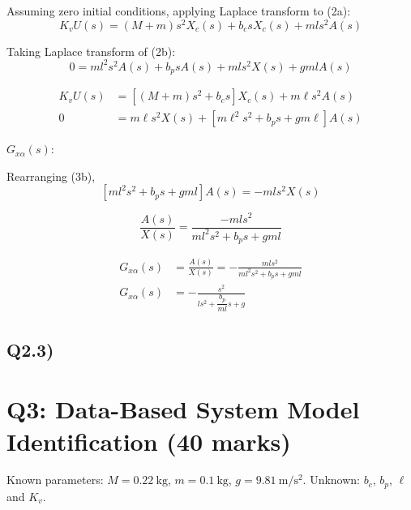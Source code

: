 \documentclass[11pt,a4paper]{article}
\renewcommand{\l}{\ell}
\begin{document}
Assuming zero initial conditions, applying Laplace transform to (2a):
\begin{equation*}
	K_{v} U(s) = \left( M + m \right) s^{2} X_{c}(s) + b_{c} s X_{c}(s)
	+ m l s^{2} A(s)
\end{equation*}

Taking Laplace transform of (2b):
\begin{equation*}
	0 = m l^{2} s^{2} A(s) + b_{p} s A(s) + m l s^{2} X(s) + g m l A(s)
\end{equation*}

\begin{align}
	K_{v} U(s) &= \left[ \left( M + m \right) s^{2} + b_{c} s \right] X_{c}(s)
	+ m \ell s^{2} A(s) \tag{3a} \\
	0 &= m \ell s^{2} X(s)
	+ \left[ m \ell^{2} s^{2} + b_{p} s + g m \ell \right] A(s) \tag{3b}
\end{align}

$G_{x\alpha}(s)$:

Rearranging (3b),
\begin{equation*}
	\left[ m l^{2} s^{2} + b_{p} s + g m l \right] A(s) = -m l s^{2} X(s)
\end{equation*}

\begin{equation*}
	\frac{A(s)}{X(s)} = \frac{-m l s^{2}}{m l^{2} s^{2} + b_{p} s + g m l}
\end{equation*}

\begin{align}
	G_{x\alpha}(s) &= \frac{A(s)}{X(s)}
	= -\frac{m l s^{2}}{m l^{2} s^{2} + b_{p} s + g m l} \tag{4a} \\
	G_{x\alpha}(s) &= -\frac{s^{2}}{l s^{2} + \dfrac{b_{p}}{m l} s + g} \tag{4b}
\end{align}

\subsection*{Q2.3)}

\section*{Q3: Data-Based System Model Identification \hfill (40 marks)}

Known parameters: $M = 0.22~\mathrm{kg}$, $m = 0.1~\mathrm{kg}$,
$g = 9.81~\mathrm{m/s^2}$. Unknown: $b_c$, $b_p$, $\l$ and $K_v$.
\end{document}
